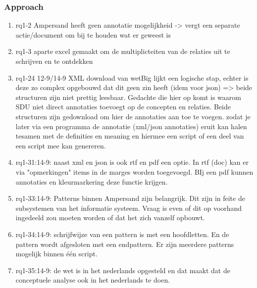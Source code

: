 \subsubsection{Approach}
\begin{comment}
plaats hier de afgehandelde items.
\end{comment}
\begin{enumerate}
    \item rq1-2 Ampersand heeft geen annotatie mogelijkheid -> vergt een separate actie/document om bij te houden wat er geweest is
    \item rq1-3 aparte excel gemaakt om de multiplicteiten van de relaties uit te schrijven en te ontdekken
    \item rq1-24 12-9/14-9 XML download van wetBig lijkt een logische stap, echter is deze zo complex opgebouwd dat dit geen zin heeft (idem voor json) => beide structuren zijn niet prettig leesbaar. Gedachte die hier op komt is waarom SDU niet direct annotaties toevoegt op de concepten en relaties. Beide structuren zijn gedownload om hier de annotaties aan toe te voegen. zodat je later via een programma de annotatie (xml/json annotaties) eruit kan halen tesamen met de definities en meaning en hiermee een script of een deel van een script mee kan genereren.
    \item rq1-31:14-9: naast xml en json is ook rtf en pdf een optie. In rtf (doc) kan er via "opmerkingen" items in de marges worden toegevoegd. BIj een pdf kunnen annotaties en kleurmarkering deze functie krijgen.
    \item rq1-33:14-9: Patterns binnen Ampersand zijn belangrijk. Dit zijn in feite de subsystemen van het informatie systeem. Vraag is even of dit op voorhand ingedeeld zou moeten worden of dat het zich vanzelf opbouwt.
    \item rq1-34:14-9: schrijfwijze van een pattern is met een hoofdletten. En de pattern wordt afgesloten met een endpattern. Er zijn meerdere patterns mogelijk binnen één script.
    \item rq1-35:14-9: de wet is in het nederlands opgesteld en dat maakt dat de conceptuele analyse ook in het nederlands te doen.
\end{enumerate}

